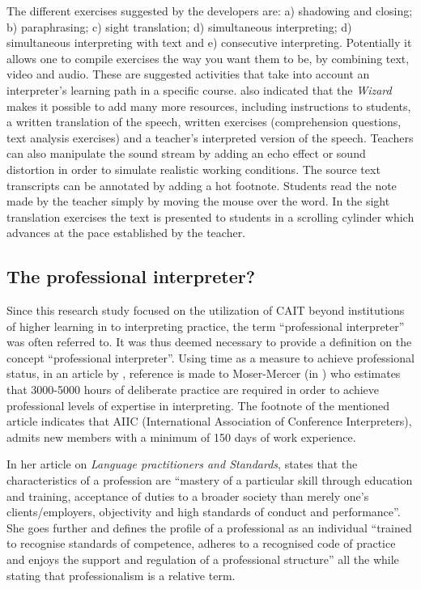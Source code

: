 \documentclass[output=paper]{langsci/langscibook}
\begin{document}
The different exercises suggested by the developers are: a) shadowing and closing; b) paraphrasing; c) sight translation; d) simultaneous interpreting; d) simultaneous interpreting with text and e) consecutive interpreting. Potentially it allows one to compile exercises the way you want them to be, by combining text, video and audio. These are suggested activities that take into account an interpreter’s learning path in a specific course. \citet[10]{Sandrelli2007a} also indicated that the \textit{Wizard} makes it possible to add many more resources, including instructions to students, a written translation of the speech, written exercises (comprehension questions, text analysis exercises) and a teacher’s interpreted version of the speech. Teachers can also manipulate the sound stream by adding an echo effect or sound distortion in order to simulate realistic working conditions. The source text transcripts can be annotated by adding a hot footnote. Students read the note made by the teacher simply by moving the mouse over the word. In the sight translation exercises the text is presented to students in a scrolling cylinder which advances at the pace established by the teacher. 

\subsection{The professional interpreter?}
Since this research study focused on the utilization of \textsc{CAIT} beyond institutions of higher learning in to interpreting practice, the term “professional interpreter” was often referred to. It was thus deemed necessary to provide a definition on the concept “professional interpreter”. Using time as a measure to achieve professional status, in an article by \citet[115]{Sandrelli2015}, reference is made to Moser-Mercer (in \citealt{Motta2006}) who estimates that 3000-5000 hours of deliberate practice are required in order to achieve professional levels of expertise in interpreting. The footnote of the mentioned article indicates that AIIC (International Association of Conference Interpreters), admits new members with a minimum of 150 days of work experience.

In her article on \textit{Language practitioners and Standards}, \citet[162]{Feinauer2005} states that the characteristics of a profession are “mastery of a particular skill through education and training, acceptance of duties to a broader society than merely one’s clients/employers, objectivity and high standards of conduct and performance”. She goes further and defines the profile of a professional as an individual “trained to recognise standards of competence, adheres to a recognised code of practice and enjoys the support and regulation of a professional structure” all the while stating that professionalism is a relative term. 
\end{document}
